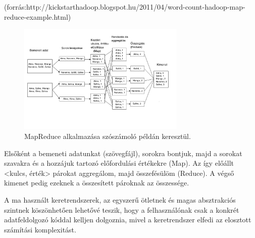 \documentclass[a4paper,12pt]{article}
\begin{document}
(forrás:http://kickstarthadoop.blogspot.hu/2011/04/word-count-hadoop-map-reduce-example.html)
\begin{figure}[ht!]
\centering
\includegraphics[width=80mm]{img/wordcountflow.jpg}
\caption{MapReduce alkalmazása  szószámoló példán keresztül. \label{wordcountflow}}
\end{figure}

Elsőként a bemeneti adatunkat (szövegfájl), sorokra bontjuk, majd a sorokat szavakra és a hozzájuk tartozó előfordulási értékekre (Map). Az így előállt <kulcs, érték> párokat aggregálom, majd összefésülöm (Reduce). A végső kimenet pedig ezeknek a összesített pároknak az összessége.

A ma használt keretrendszerek, az egyszerű ötletnek és magas absztrakciós szintnek köszönhetően lehetővé teszik, hogy a felhasználónak csak a konkrét adatfeldolgozó kóddal kelljen dolgoznia, mivel a keretrendszer elfedi az elosztott számítási komplexitást. ~\cite{hadoop}
\end{document}
